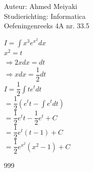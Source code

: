 \documentclass[a4paper]{article}
\begin{document}
  
\noindent \large Auteur: Ahmed Meiyaki \\
\noindent \large Studierichting: Informatica\\
\noindent \large Oefeningenreeks 4A nr. 33.5\\

\medskip

\normalsize

$I = \displaystyle\int x^3 e^{x^2} dx $\\

$x^2 = t $\\

$\Rightarrow 2xdx = dt $\\

$\Rightarrow xdx = \dfrac{1}{2}dt $\\

$I = \dfrac{1}{2} \displaystyle\int t e^t dt $\\

$= \dfrac{1}{2} \left(e^t t - \displaystyle\int e^t dt\right) $\\

$= \dfrac{1}{2} e^t t - \dfrac{1}{2} e^t + C $\\

$= \dfrac{1}{2} e^t \left(t -  1\right) + C $\\

$= \dfrac{1}{2} e^{x^2} \left(x^2 - 1\right) + C $\\





\begin{thebibliography}{999}
\end{thebibliography}
\end{document}
